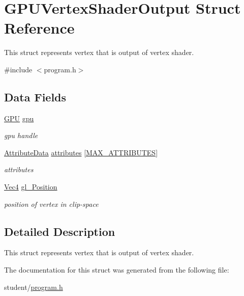 \hypertarget{structGPUVertexShaderOutput}{\section{G\-P\-U\-Vertex\-Shader\-Output Struct Reference}
\label{structGPUVertexShaderOutput}
}


This struct represents vertex that is output of vertex shader.  




{\ttfamily \#include $<$program.\-h$>$}

\subsection*{Data Fields}
\begin{DoxyCompactItemize}
\item 
\hypertarget{structGPUVertexShaderOutput_a7eff72bf2de93c80688800ffcd142e34}{\hyperlink{fwd_8h_a06964ec111fe28721d8618b6d0d993bf}{G\-P\-U} \hyperlink{structGPUVertexShaderOutput_a7eff72bf2de93c80688800ffcd142e34}{gpu}}\label{structGPUVertexShaderOutput_a7eff72bf2de93c80688800ffcd142e34}

\begin{DoxyCompactList}\small\item\em gpu handle \end{DoxyCompactList}\item 
\hypertarget{structGPUVertexShaderOutput_acb55a42bf173ac38ad5a9c0951758e52}{\hyperlink{fwd_8h_aa9879a02fad39161594e48222b5d9660}{Attribute\-Data} \hyperlink{structGPUVertexShaderOutput_acb55a42bf173ac38ad5a9c0951758e52}{attributes} \mbox{[}\hyperlink{fwd_8h_a4d992a1f9192388588184753115f6c03}{M\-A\-X\-\_\-\-A\-T\-T\-R\-I\-B\-U\-T\-E\-S}\mbox{]}}\label{structGPUVertexShaderOutput_acb55a42bf173ac38ad5a9c0951758e52}

\begin{DoxyCompactList}\small\item\em attributes \end{DoxyCompactList}\item 
\hypertarget{structGPUVertexShaderOutput_a9ff78df1457c9f433df05ba8858d90fe}{\hyperlink{structVec4}{Vec4} \hyperlink{structGPUVertexShaderOutput_a9ff78df1457c9f433df05ba8858d90fe}{gl\-\_\-\-Position}}\label{structGPUVertexShaderOutput_a9ff78df1457c9f433df05ba8858d90fe}

\begin{DoxyCompactList}\small\item\em position of vertex in clip-\/space \end{DoxyCompactList}\end{DoxyCompactItemize}


\subsection{Detailed Description}
This struct represents vertex that is output of vertex shader. 

The documentation for this struct was generated from the following file\-:\begin{DoxyCompactItemize}
\item 
student/\hyperlink{program_8h}{program.\-h}\end{DoxyCompactItemize}
